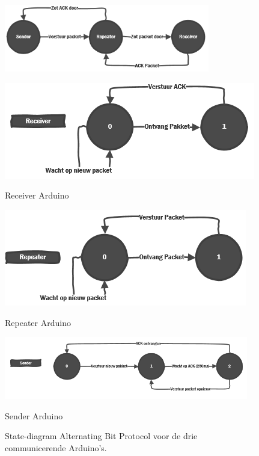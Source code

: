 \documentclass[a4paper,10pt]{article}
\begin{document}
\begin{figure}[ht!]
    \centering
    \includegraphics[width=0.8\textwidth]{flow.png}
    \caption{}
    \label{fig:flow}
\end{figure}

\begin{figure}[ht!]
    \begin{minipage}{\textwidth}
        \begin{minipage}{0.49\textwidth}
            \centering
            \includegraphics[width=\textwidth]{receiver.png}
            \caption*{Receiver Arduino}
        \end{minipage}
        \hfill
        \begin{minipage}{0.49\textwidth}
            \centering
            \includegraphics[width=\textwidth]{repeater.png}
            \caption*{Repeater Arduino}
        \end{minipage}
        \hfill\centering
        \begin{minipage}{0.8\textwidth}
            \centering
            \includegraphics[width=0.95\textwidth]{sender.png}
            \caption*{Sender Arduino}
        \end{minipage}
    \caption{State-diagram Alternating Bit Protocol voor de drie communicerende Arduino's.}
    \label{fig:roles}
    \end{minipage}
\end{figure}
\end{document}
